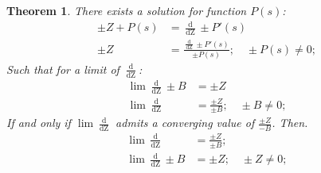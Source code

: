 \documentclass[10pt, twocolumn]{article}
\theoremstyle{plain}
\newtheorem{theorem}{Theorem}[section]
\theoremstyle{definition}
\theoremstyle{remark}
\begin{document}
\begin{theorem}
	There exists a solution for function $P(s)$:
	\begin{align*}
		\pm Z + P(s) &= \frac{\operatorname{d}}{\operatorname{dZ}} \pm P'(s)\\
		\pm Z &= \frac{\frac{\operatorname{d}}{\operatorname{dZ}} \pm P'(s)}{\pm P(s)}; \quad \pm P(s) \neq 0;
	\end{align*}
	Such that for a limit of $\frac{\operatorname{d}}{\operatorname{dZ}}$:
	\begin{align*}
		\lim \frac{\operatorname{d}}{\operatorname{dZ}} \pm B &= \pm Z\\
		\lim \frac{\operatorname{d}}{\operatorname{dZ}} &= \frac{\pm Z}{\pm B}; \quad \pm B \neq 0;
	\end{align*}
	If and only if $\lim \frac{\operatorname{d}}{\operatorname{dZ}}$ admits a converging value of $\frac{\pm Z}{-B}$. Then.
	\begin{align*}
		\lim \frac{\operatorname{d}}{\operatorname{dZ}} &= \frac{\pm Z}{\pm B};\\
		\lim \frac{\operatorname{d}}{\operatorname{dZ}} \pm B &= \pm Z; \quad \pm Z \neq 0;
	\end{align*}
\end{theorem}

\nocite{*}



\end{document}
